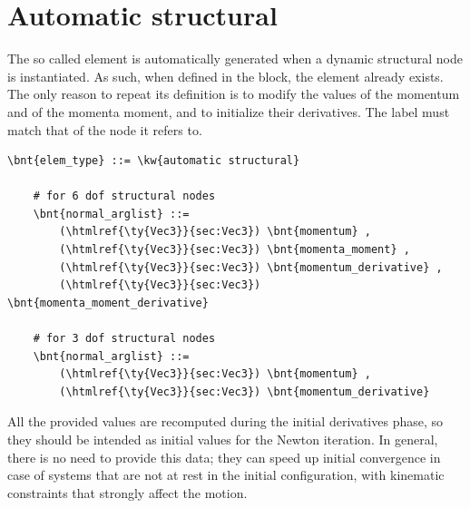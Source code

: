 \section{Automatic structural}
The so called  element is automatically generated
when a dynamic structural node is instantiated.
As such, when defined in the  block,
the element already exists.
The only reason to repeat its definition is to modify the values
of the momentum and of the momenta moment, and to initialize
their derivatives.
The label must match that of the node it refers to.
\begin{Verbatim}[commandchars=\\\{\}]
    \bnt{elem_type} ::= \kw{automatic structural}

    # for 6 dof structural nodes
    \bnt{normal_arglist} ::=
        (\htmlref{\ty{Vec3}}{sec:Vec3}) \bnt{momentum} ,
        (\htmlref{\ty{Vec3}}{sec:Vec3}) \bnt{momenta_moment} ,
        (\htmlref{\ty{Vec3}}{sec:Vec3}) \bnt{momentum_derivative} ,
        (\htmlref{\ty{Vec3}}{sec:Vec3}) \bnt{momenta_moment_derivative}

    # for 3 dof structural nodes
    \bnt{normal_arglist} ::=
        (\htmlref{\ty{Vec3}}{sec:Vec3}) \bnt{momentum} ,
        (\htmlref{\ty{Vec3}}{sec:Vec3}) \bnt{momentum_derivative}
\end{Verbatim}
All the provided values are recomputed during the initial derivatives phase,
so they should be intended as initial values for the Newton iteration.
In general, there is no need to provide this data; they can speed up
initial convergence in case of systems that are not at rest in the initial
configuration, with kinematic constraints that strongly affect
the motion.

